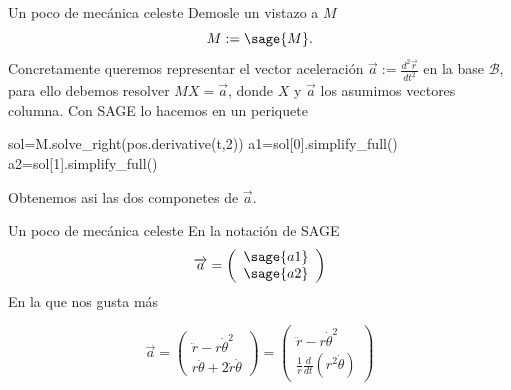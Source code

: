 \documentclass[handout,hyperref={colorlinks=true}]{beamer}
\renewcommand{\v}[1]{\overrightarrow{#1}}
\begin{document}
\begin{frame}[fragile]{Un poco de mecánica celeste}
Demosle un vistazo a $M$
\[M:=\sage{M}.\]
Concretamente queremos representar el vector aceleración $\v{a}:=\tfrac{d^2\v{r}}{dt^2}$ en la base $\mathcal{B}$, para ello  debemos resolver $MX=\v{a}$, donde $X$ y 
$\v{a}$ los asumimos vectores columna. Con SAGE lo hacemos en un periquete
\begin{sageblock}
  sol=M.solve_right(pos.derivative(t,2))
  a1=sol[0].simplify_full()
  a2=sol[1].simplify_full()
\end{sageblock}
Obtenemos asi las dos componetes de $\v{a}$.
\end{frame}


\begin{frame}[fragile]{Un poco de mecánica celeste}
En la notación de SAGE
\[
 \v{a}=\left(\begin{array}{c}
              \sage{a1}\\
              \sage{a2}
             \end{array}
 \right)
\]
En la que nos gusta más

\[
 \v{a}=\left(\begin{array}{c}
              \ddot{r}-r\dot{\theta}^2 \\
              r\ddot{\theta}+2\dot{r}\dot{\theta}
             \end{array}
 \right)=
 \left(\begin{array}{c}
              \ddot{r}-r\dot{\theta}^2 \\
              \frac{1}{r}\frac{d}{dt} \left( r^2\dot{\theta} \right) 
             \end{array}
 \right)
\]
\end{frame}
\end{document}

